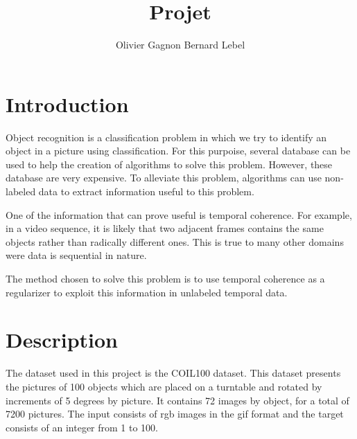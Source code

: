 \documentclass{article} %
\title{Projet}
\author{
Olivier Gagnon \And Bernard Lebel
}
\begin{document}
\maketitle

\begin{abstract}

\end{abstract}

\section{Introduction}

Object recognition is a classification problem in which we try to identify an object in a picture using classification. For this purpoise, several database can be used to help the creation of algorithms to solve this problem. However, these database are very expensive. To alleviate this problem, algorithms can use non-labeled data to extract information useful to this problem.

One of the information that can prove useful is temporal coherence. For example, in a video sequence, it is likely that two adjacent frames contains the same objects rather than radically different ones. This is true to many other domains were data is sequential in nature.

The method chosen to solve this problem is to use temporal coherence as a regularizer to exploit this information in unlabeled temporal data\cite{?}.

\section{Description}
The dataset used in this project is the COIL100 dataset\cite{?}. This dataset presents the pictures of 100 objects which are placed on a turntable and rotated by increments of 5 degrees by picture. It contains 72 images by object, for a total of 7200 pictures. The input consists of rgb images in the gif format and the target consists of an integer from 1 to 100.
\end{document}
